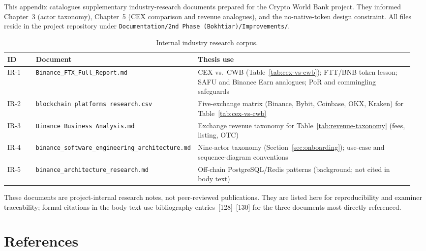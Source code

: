 \documentclass[12pt,a4paper]{report}
\newcommand{\tableheadcolor}{\rowcolor{TableHeadBg}}
\begin{document}
This appendix catalogues supplementary industry-research documents prepared for the Crypto World Bank project. They informed Chapter~3 (actor taxonomy), Chapter~5 (CEX comparison and revenue analogues), and the no-native-token design constraint. All files reside in the project repository under \texttt{Documentation/2nd Phase (Bokhtiar)/Improvements/}.

\begin{table}[H]
\centering
\caption[Internal industry research corpus]{Internal industry research corpus.}
\label{tab:internal-research}
\begingroup
\footnotesize
\setlength{\tabcolsep}{4pt}
\renewcommand{\arraystretch}{1.15}
\begin{tabular}{@{}%
  >{\raggedright\arraybackslash}p{0.07\linewidth}%
  >{\raggedright\arraybackslash}p{0.36\linewidth}%
  >{\raggedright\arraybackslash}p{0.53\linewidth}@{}}
\toprule
\tableheadcolor
\textbf{ID} & \textbf{Document} & \textbf{Thesis use} \\
\midrule
IR-1 & \texttt{Binance\_FTX\_Full\_Report.md} & CEX vs.\ CWB (Table~\ref{tab:cex-vs-cwb}); FTT/BNB token lesson; SAFU and Binance Earn analogues; PoR and commingling safeguards \\
IR-2 & \texttt{blockchain platforms research.csv} & Five-exchange matrix (Binance, Bybit, Coinbase, OKX, Kraken) for Table~\ref{tab:cex-vs-cwb} \\
IR-3 & \texttt{Binance Business Analysis.md} & Exchange revenue taxonomy for Table~\ref{tab:revenue-taxonomy} (fees, listing, OTC) \\
IR-4 & \texttt{binance\_software\_engineering\_architecture.md} & Nine-actor taxonomy (Section~\ref{sec:onboarding}); use-case and sequence-diagram conventions \\
IR-5 & \texttt{binance\_architecture\_research.md} & Off-chain PostgreSQL/Redis patterns (background; not cited in body text) \\
\bottomrule
\end{tabular}
\endgroup
\end{table}

\noindent These documents are project-internal research notes, not peer-reviewed publications. They are listed here for reproducibility and examiner traceability; formal citations in the body text use bibliography entries~[128]--[130] for the three documents most directly referenced.

\chapter*{References}
{}
\end{document}

